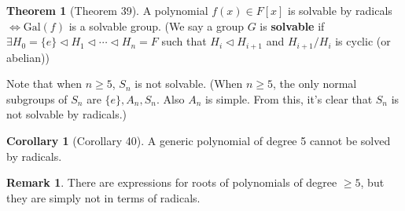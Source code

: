 \documentclass{article}
\theoremstyle{definition}
\newtheorem{thm}{Theorem}
\newtheorem{rem}{Remark}
\newtheorem{cor}{Corollary}
\newcommand{\Lra}{\Leftrightarrow}
\newcommand{\Gal}{\text{Gal}}
\begin{document}
\begin{thm}[Theorem 39]
	A polynomial $f(x) \in F[x]$ is solvable by radicals $\Lra \Gal(f)$ is a solvable group.
	(We say a group $G$ is \textbf{solvable} if $\exists H_0 = \{e\} \triangleleft H_1 \triangleleft \cdots \triangleleft H_n = F$ such that $H_i \triangleleft H_{i + 1}$ and $H_{i + 1}/H_i$ is cyclic (or abelian))
\end{thm}

Note that when $n \geq 5$, $S_n$ is not solvable.
(When $n \geq 5$, the only normal subgroups of $S_n$ are $\{e\}, A_n, S_n$.
Also $A_n$ is simple.
From this, it's clear that $S_n$ is not solvable by radicals.)

\begin{cor}[Corollary 40]
	A generic polynomial of degree 5 cannot be solved by radicals.
\end{cor}

\begin{rem}
	There are expressions for roots of polynomials of degree $\geq 5$, but they are simply not in terms of radicals. 
\end{rem}
\end{document}

